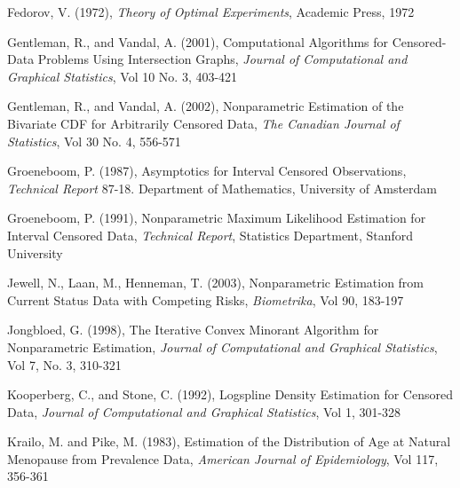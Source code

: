 \documentclass[10pt]{article}
\begin{document}
Fedorov, V. (1972), \emph{Theory of Optimal Experiments}, Academic Press, 1972 

\vspace{3mm}

Gentleman, R., and Vandal, A. (2001), Computational Algorithms for Censored-Data Problems Using Intersection Graphs, \emph{Journal of Computational and Graphical Statistics}, Vol 10 No. 3, 403-421

\vspace{3mm} 

Gentleman, R., and Vandal, A. (2002), Nonparametric Estimation of the Bivariate CDF for Arbitrarily Censored Data, \emph{The Canadian Journal of Statistics}, Vol 30 No. 4, 556-571

\vspace{3mm}

Groeneboom, P. (1987), Asymptotics for Interval Censored Observations, \emph{Technical Report} 87-18. Department of Mathematics, University of Amsterdam 

\vspace{3mm}

Groeneboom, P. (1991), Nonparametric Maximum Likelihood Estimation for Interval Censored Data, \emph{Technical Report}, Statistics Department, Stanford University

\vspace{3mm}

Jewell, N., Laan, M., Henneman, T. (2003), Nonparametric Estimation from Current Status Data with Competing Risks, \emph{Biometrika}, Vol 90, 183-197

\vspace{3mm}

Jongbloed, G. (1998), The Iterative Convex Minorant Algorithm for Nonparametric Estimation, \emph{Journal of Computational and Graphical Statistics}, Vol 7, No. 3, 310-321

\vspace{3mm}

Kooperberg, C., and Stone, C. (1992), Logspline Density Estimation for Censored Data, \emph{Journal of Computational and Graphical Statistics}, Vol 1, 301-328

\vspace{3mm}

Krailo, M. and Pike, M. (1983), Estimation of the Distribution of Age at Natural Menopause from Prevalence Data, \emph{American Journal of Epidemiology}, Vol 117, 356-361

\vspace{3mm}
\end{document}
